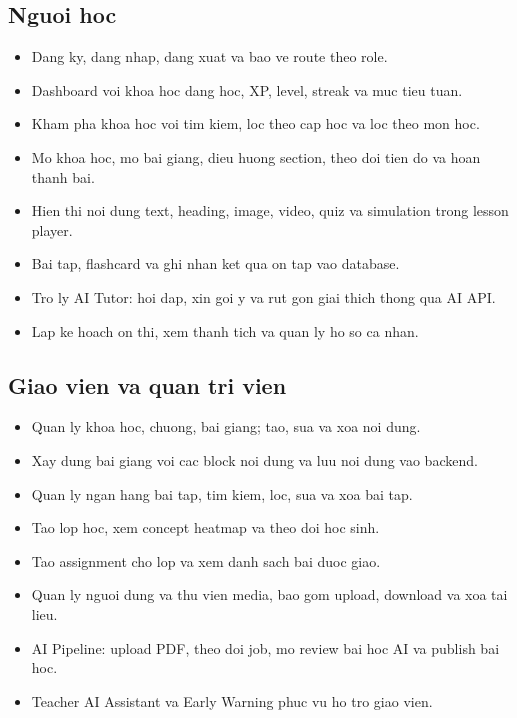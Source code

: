 \documentclass[12pt,a4paper]{article}
\begin{document}
\subsection{Nguoi hoc}
\begin{itemize}[leftmargin=*]
  \item Dang ky, dang nhap, dang xuat va bao ve route theo role.
  \item Dashboard voi khoa hoc dang hoc, XP, level, streak va muc tieu tuan.
  \item Kham pha khoa hoc voi tim kiem, loc theo cap hoc va loc theo mon hoc.
  \item Mo khoa hoc, mo bai giang, dieu huong section, theo doi tien do va hoan thanh bai.
  \item Hien thi noi dung text, heading, image, video, quiz va simulation trong lesson player.
  \item Bai tap, flashcard va ghi nhan ket qua on tap vao database.
  \item Tro ly AI Tutor: hoi dap, xin goi y va rut gon giai thich thong qua AI API.
  \item Lap ke hoach on thi, xem thanh tich va quan ly ho so ca nhan.
\end{itemize}

\subsection{Giao vien va quan tri vien}
\begin{itemize}[leftmargin=*]
  \item Quan ly khoa hoc, chuong, bai giang; tao, sua va xoa noi dung.
  \item Xay dung bai giang voi cac block noi dung va luu noi dung vao backend.
  \item Quan ly ngan hang bai tap, tim kiem, loc, sua va xoa bai tap.
  \item Tao lop hoc, xem concept heatmap va theo doi hoc sinh.
  \item Tao assignment cho lop va xem danh sach bai duoc giao.
  \item Quan ly nguoi dung va thu vien media, bao gom upload, download va xoa tai lieu.
  \item AI Pipeline: upload PDF, theo doi job, mo review bai hoc AI va publish bai hoc.
  \item Teacher AI Assistant va Early Warning phuc vu ho tro giao vien.
\end{itemize}
\end{document}
